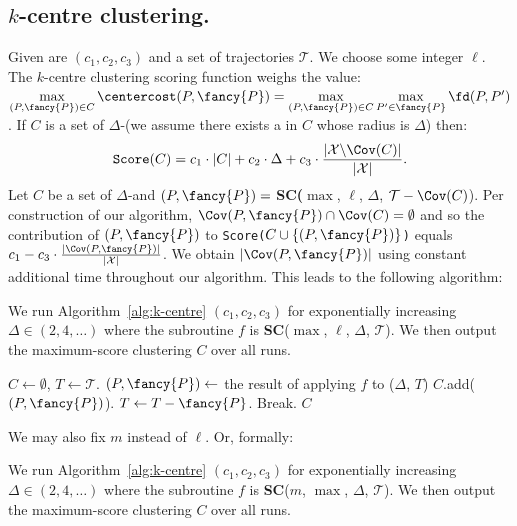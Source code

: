 \subsection{\texorpdfstring{$k$-centre clustering.}{k-centre clustering}}
%
Given are $(c_1, c_2, c_3)$ and a set of trajectories $\mathcal{T}$. 
We choose some integer $\ell$. 
The $k$-centre clustering scoring function weighs the value:  $\max\limits_{(P, {\fancy{P}}) \in C} \centercost(P, {\fancy{P}}) = \max\limits_{(P, {\fancy{P}}) \in C} \max\limits_{P' \in {\fancy{P}}} \fd(P, P')$.
\vspace{0.5cm}
%
\noindent
If $C$ is a set of $\Delta$-\pathlets (we assume there exists a \pathlet in $C$ whose radius is $\Delta$) then:
\[
\texttt{Score}(C) =  c_1 \cdot |C| + c_2 \cdot \Delta + c_3 \cdot \frac{|\mathcal{X} \backslash \Cov(C) |}{|\mathcal{X}|}. 
\]
%
%
\noindent
Let $C$ be a set of $\Delta$-\pathlets and $(P, {\fancy{P}})=$ \textbf{SC(}$\max$, $\ell$, $\Delta$, $\mathcal{T} - \Cov(C)$).
Per construction of our algorithm, $\Cov(P, {\fancy{P}}) \cap \Cov(C) = \emptyset$ and so the contribution of  $(P, {\fancy{P}})$ to \texttt{Score($C \cup \{ (P, {\fancy{P}})\}$)} equals $c_1 - c_3 \cdot \frac{|\Cov(P, {\fancy{P}})|}{|\mathcal{X}|}$.
We obtain $|\Cov(P, {\fancy{P}})|$ using constant additional time throughout our algorithm.
This leads to the following algorithm:
%
\begin{algodef}
\label{algodef:k-centre-length}
    We run Algorithm~\ref{alg:k-centre} $(c_1, c_2, c_3)$ for exponentially increasing $\Delta \in (2, 4, \ldots )$  where the subroutine $f$ is \textbf{SC}($\max$, $\ell$, $\Delta$, $\mathcal{T}$). We then output the maximum-score clustering $C$ over all runs.
\end{algodef}
%
%
%
%
%
%
%
%
 \begin{algorithm}[h]
    \caption{\texttt{k\_centre}(\texttt{vector} $(c_1, c_2, c_3)$, \texttt{value} $\Delta$, \texttt{trajectory} $\mathcal{T}$, \texttt{subroutine} $f$) }
    \label{alg:k-centre}
    \begin{algorithmic}
    \State $C \gets \emptyset$, $T \gets \mathcal{T}$.
    \State $(P, {\fancy{P}}) \gets $ the result of applying $f$ to ($\Delta$, $T$)
    \State $C$.add($(P, {\fancy{P}})$).
    \State $T \gets T - {\fancy{P}}$.
    \Else
    \State Break.
    \EndIf
    \EndWhile
    \State \Return $C$
    \end{algorithmic}
  \end{algorithm}
%
%
\noindent
We may also fix $m$ instead of $\ell$. Or, formally:
%
\begin{algodef}
\label{algodef:k-centre-size}
         We run Algorithm~\ref{alg:k-centre} $(c_1, c_2, c_3)$ for exponentially increasing $\Delta \in (2, 4, \ldots )$  where the subroutine $f$ is \textbf{SC}($m$, $\max$, $\Delta$, $\mathcal{T}$). We then output the maximum-score clustering $C$ over all runs.
\end{algodef}
%
%
%

